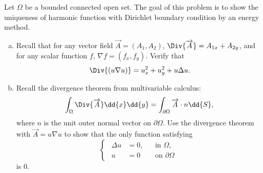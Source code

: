 \documentclass[plain]{pset}
\begin{document}
\begin{problem}
Let \(\Omega\) be a bounded connected open set. The goal of this problem is to show the uniqueness of harmonic function with Dirichlet boundary condition by an energy method.
\begin{enumerate}[(a)]
    \item Recall that for any vector field \(\overrightarrow{A} = (A_1, A_2)\), \(\Div{\overrightarrow{A}} = A_{1x} + A_{2y}\), and for any scalar function \(f\), \(\nabla f = (f_x, f_y)\). Verify that
          \[
              \Div{(u\nabla u)} = u_x^2 + u_y^2 + u\Delta u.
          \]
    \item Recall the divergence theorem from multivariable calculus:
          \[\int_\Omega \Div{\overrightarrow{A}} \dd{x} \dd{y} = \int_{\partial \Omega} \overrightarrow{A} \cdot n \dd{S},\]
          where \(n\) is the unit outer normal vector on \(\partial \Omega\). Use the divergence theorem with \(\overrightarrow{A} = u\nabla u\) to show that the only function satisfying
          \[
              \begin{cases}
                  \begin{aligned}
                      \Delta u & = 0, &  & \text{in } \Omega,         \\
                      u        & = 0  &  & \text{on } \partial \Omega
                  \end{aligned}
              \end{cases}
          \]
          is \(0\).
\end{enumerate}
\end{problem}
\end{document}
